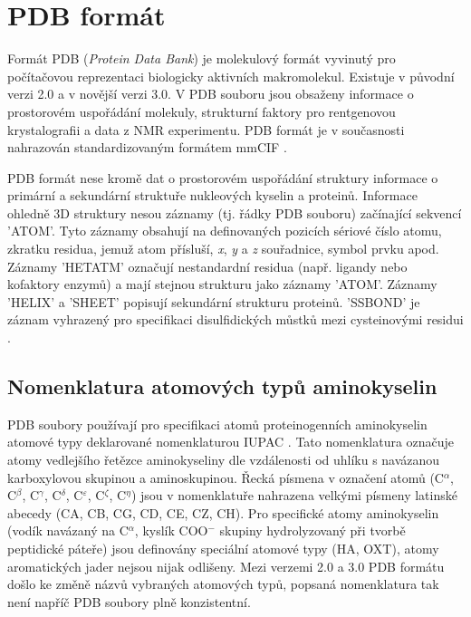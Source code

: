 \section{PDB formát}
Formát PDB (\textit{Protein Data Bank}) je molekulový formát vyvinutý pro počítačovou reprezentaci biologicky aktivních makromolekul. Existuje  v původní verzi 2.0 a v novější verzi 3.0. V PDB souboru jsou obsaženy informace o prostorovém uspořádání molekuly, strukturní faktory pro rentgenovou krystalografii a data z NMR experimentu. PDB formát je v současnosti nahrazován standardizovaným formátem mmCIF \cite{mmcif}.

PDB formát nese kromě dat o prostorovém uspořádání struktury informace o primární a sekundární struktuře nukleových kyselin a proteinů. Informace ohledně 3D struktury nesou záznamy (tj. řádky PDB souboru) začínající sekvencí 'ATOM'. Tyto záznamy obsahují na definovaných pozicích sériové číslo atomu, zkratku residua, jemuž atom přísluší, \textit{x}, \textit{y} a \textit{z} souřadnice, symbol prvku apod. Záznamy 'HETATM' označují nestandardní residua (např. ligandy nebo kofaktory enzymů) a mají stejnou strukturu jako záznamy 'ATOM'. Záznamy 'HELIX' a 'SHEET' popisují sekundární strukturu proteinů. 'SSBOND' je záznam vyhrazený pro specifikaci disulfidických můstků mezi cysteinovými residui \cite{PDB1, PDB2}. 

\subsection{Nomenklatura atomových typů aminokyselin}
PDB soubory používají pro specifikaci atomů proteinogenních aminokyselin atomové typy deklarované nomenklaturou IUPAC \cite{AA_nomenclature}. Tato nomenklatura označuje atomy vedlejšího řetězce aminokyseliny dle vzdálenosti od uhlíku s navázanou karboxylovou skupinou a aminoskupinou. Řecká písmena v označení atomů (C$^\alpha$, C$^\beta$, C$^\gamma$, C$^\delta$, C$^\varepsilon$, C$^\zeta$, C$^\eta$) jsou v nomenklatuře nahrazena velkými písmeny latinské abecedy (CA, CB, CG, CD, CE, CZ, CH). Pro specifické atomy aminokyselin (vodík navázaný na C$^\alpha$, kyslík COO$^-$ skupiny hydrolyzovaný při tvorbě peptidické páteře) jsou definovány speciální atomové typy (HA, OXT), atomy aromatických jader nejsou nijak odlišeny. Mezi verzemi 2.0 a 3.0 PDB formátu došlo ke změně názvů vybraných atomových typů, popsaná nomenklatura tak není napříč PDB soubory plně konzistentní. 

